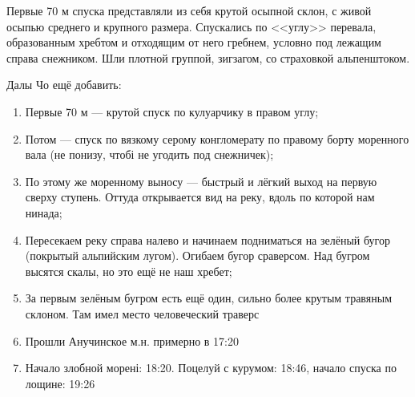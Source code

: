 Первые 70 м спуска представляли из себя крутой осыпной склон, с живой осыпью среднего и крупного размера. Спускались по <<углу>> перевала, образованным хребтом и отходящим от него гребнем, условно под лежащим справа снежником. Шли  плотной группой, зигзагом, со страховкой альпенштоком.  

Далы
Чо ещё добавить: 
\begin{enumerate} 
	\item Первые 70 м — крутой спуск по кулуарчику в правом углу; 
	\item Потом — спуск по вязкому серому конгломерату по правому борту моренного вала (не понизу, чтобі не угодить под снежничек); 
	\item По этому же моренному выносу — быстрый и лёгкий выход на первую сверху ступень. Оттуда открывается вид на реку, вдоль по которой нам нинада; 
	\item Пересекаем реку справа налево и начинаем подниматься на зелёный бугор (покрытый альпийским лугом). Огибаем бугор сраверсом. Над бугром высятся скалы, но это ещё не наш хребет; 
	\item  За первым зелёным бугром есть ещё один, сильно более крутым травяным склоном. Там имел место человеческий траверс\texttrademark
	\item Прошли Анучинское м.н. примерно в 17:20
	\item Начало злобной морені: 18:20. Поцелуй с курумом: 18:46, начало спуска по лощине: 19:26
\end{enumerate}


\clearpage